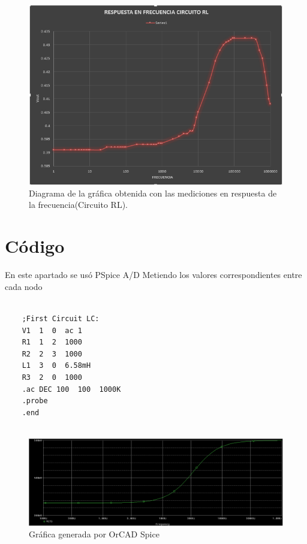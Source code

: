 \documentclass[letterpaper,10pt]{article}
\begin{document}
 

\vspace*{0.2in}
\begin{figure}[h!]
	\centering
	\includegraphics[scale=0.9]{RESPUESTAEN}
	\caption{Diagrama de la gráfica obtenida con las mediciones en respuesta de la frecuencia(Circuito RL).}
\end{figure}

 \pagebreak
 
 
 \section{Código}
\begin{center}
	En este apartado se usó PSpice A/D Metiendo los valores correspondientes entre cada nodo
	\begin{lstlisting}[frame=single]
	
	;First Circuit LC:
	V1  1  0  ac 1
	R1	1  2  1000
	R2  2  3  1000
	L1  3  0  6.58mH
	R3  2  0  1000
	.ac DEC 100  100  1000K
	.probe
	.end
	
	\end{lstlisting}
	
	\vspace*{0.2in}
	\begin{figure}[h!]
		\centering
		\includegraphics[scale= 0.45]{ORCADRLSIMULATE}
		\caption{Gráfica generada por OrCAD Spice}
	\end{figure}
	
\end{center}
\FloatBarrier
\end{document}
